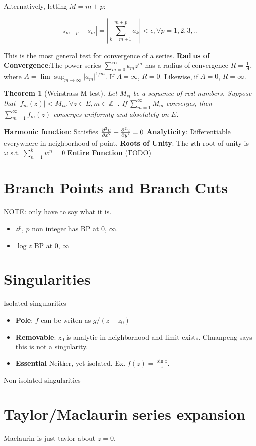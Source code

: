 \documentclass{article}
\newtheorem{theorem}{Theorem}[section]
\theoremstyle{definition}
\begin{document}
\begin{multicols}{3}
Alternatively, letting $M = m+p$:

$$|s_{m+p} - s_m| = \left|\sum_{k=m+1}^{m+p}a_k\right| < \epsilon, \forall p = 1,2,3,..$$

This is the most general test for convergence of a series. 
\textbf{Radius of Convergence}:The power series $\sum_{m=0}^\infty a_m z^m$ has a radius of convergence $R = \frac{1}{A}$, where $A =\lim\sup_{m \to \infty } |a_m|^{1/m}$. If $A = \infty$, $R = 0$. Likewise, if $A=0$, $R = \infty$.

\begin{theorem}[Weirstrass M-test]
	Let $M_m$ be a sequence of real numbers. Suppose that $|f_m(z)| < M_m, \forall z \in E, m\in \mathbb{Z}^+$.  If $\sum_{m=1}^\infty M_m$ converges, then $\sum_{m=1}^\infty f_m(z)$ converges uniformly and absolutely on $E$. 
\end{theorem}
 
\textbf{Harmonic function}: Satisfies $\pdv{^2u}{x^2} + \pdv{^2u}{y^2} = 0$
\textbf{Analyticity}: Differentiable everywhere in neighborhood of point.
\textbf{Roots of Unity}: The $k$th root of unity is $\omega$ s.t. $\sum_{n=1}^{k} w^n =0$
\textbf{Entire Function} (TODO)


\section{Branch Points and Branch Cuts}
NOTE: only have to say what it is. 
\begin{itemize}
	\item $z^p$, $p$ non integer has BP at 0, $\infty$.
	\item $\log z$ BP at 0, $\infty$
\end{itemize}
\section{Singularities}
Isolated singularities
\begin{itemize}
	\item \textbf{Pole}: $f$ can be writen as $g/(z-z_0)$
	\item \textbf{Removable}: $z_0$ is analytic in neighborhood and limit exists. Chuanpeng says this is not a singularity.
	\item \textbf{Essential} Neither, yet isolated. Ex. $f(z) = \frac{\sin z}{z}$.
\end{itemize}
Non-isolated singularities 

\section{Taylor/Maclaurin series expansion}
Maclaurin is just taylor about $z=0$.


\end{multicols}
\end{document}
